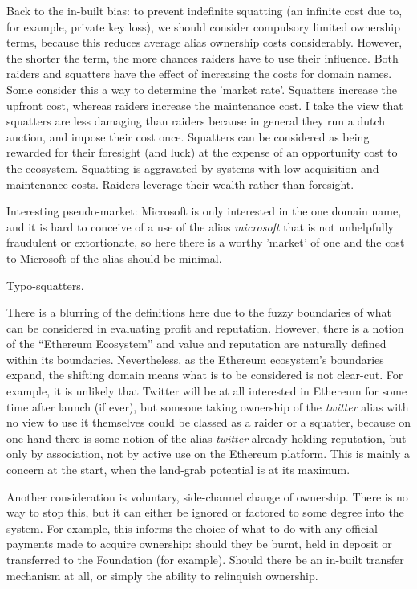 \documentclass[10pt,a4paper]{article}
\begin{document}
Back to the in-built bias: to prevent indefinite squatting (\ie an infinite cost due to, for example, private key loss), we should consider compulsory limited ownership terms, because this reduces average alias ownership costs considerably. However, the shorter the term, the more chances raiders have to use their influence. Both raiders and squatters have the effect of increasing the costs for domain names. Some consider this a way to determine the 'market rate'. Squatters increase the upfront cost, whereas raiders increase the maintenance cost. I take the view that squatters are less damaging than raiders because in general they run a dutch auction, and impose their cost once. Squatters can be considered as being rewarded for their foresight (and luck) at the expense of an opportunity cost to the ecosystem. Squatting is aggravated by systems with low acquisition and maintenance costs. Raiders leverage their wealth rather than foresight. 

Interesting pseudo-market: Microsoft is only interested in the one domain name, and it is hard to conceive of a use of the alias {\it microsoft} that is not unhelpfully fraudulent or extortionate, so here there is a worthy 'market' of one and the cost to Microsoft of the alias should be minimal.

Typo-squatters.

There is a blurring of the definitions here due to the fuzzy boundaries of what can be considered in evaluating profit and reputation. However, there is a notion of the ``Ethereum Ecosystem'' and value and reputation are naturally defined within its boundaries. Nevertheless, as the Ethereum ecosystem's boundaries expand, the shifting domain means what is to be considered is not clear-cut. For example, it is unlikely that Twitter will be at all interested in Ethereum for some time after launch (if ever), but someone taking ownership of the {\it twitter} alias with no view to use it themselves could be classed as a raider or a squatter, because on one hand there is some notion of the alias {\it twitter} already holding reputation, but only by association, not by active use on the Ethereum platform. This is mainly a concern at the start, when the land-grab potential is at its maximum.

Another consideration is voluntary, side-channel change of ownership. There is no way to stop this, but it can either be ignored or factored to some degree into the system. For example, this informs the choice of what to do with any official payments made to acquire ownership: should they be burnt, held in deposit or transferred to the Foundation (for example). Should there be an in-built transfer mechanism at all, or simply the ability to relinquish ownership.
\end{document}
